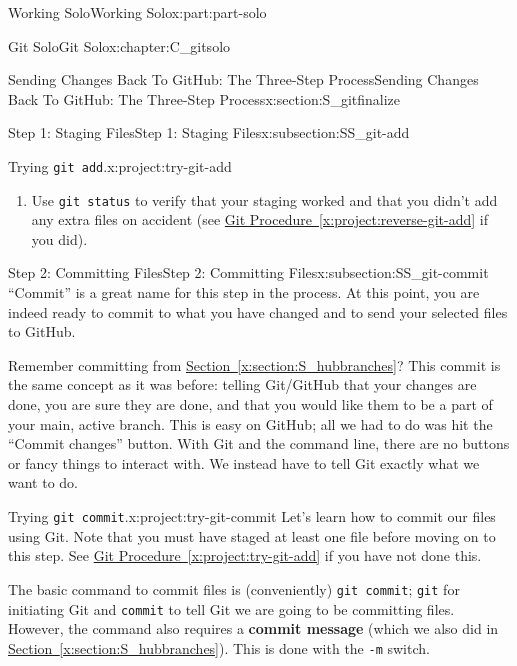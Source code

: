 \documentclass[oneside,10pt,]{book}
\newcommand{\blocktitlefont}{\relax}
\newcommand{\xreffont}{\relax}
\newcommand{\mono}[1]{\texttt{#1}}
\newcommand{\terminology}[1]{\textbf{#1}}
\begin{document}
\begin{partptx}{Working Solo}{}{Working Solo}{}{}{x:part:part-solo}
\begin{chapterptx}{Git Solo}{}{Git Solo}{}{}{x:chapter:C_gitsolo}
\begin{sectionptx}{Sending Changes Back To GitHub: The Three-Step Process}{}{Sending Changes Back To GitHub: The Three-Step Process}{}{}{x:section:S_gitfinalize}
\begin{subsectionptx}{Step 1: Staging Files}{}{Step 1: Staging Files}{}{}{x:subsection:SS_git-add}
\begin{project}{Trying \mono{git add}.}{x:project:try-git-add}
\begin{enumerate}[font=\bfseries,label=(\alph*),ref=\alph*]
\par\smallskip%
\noindent\textbf{\blocktitlefont Hint}.\hypertarget{g:hint:idm479812568}{}\quad{}Case 1 or Case 3 will work in this instance.%
\item{}Use \mono{git status} to verify that your staging worked and that you didn't add any extra files on accident (see \hyperref[x:project:reverse-git-add]{Git Procedure~{\xreffont\ref{x:project:reverse-git-add}}} if you did).%
\end{enumerate}
\end{project}%
\end{subsectionptx}
%
%
\typeout{************************************************}
\typeout{************************************************}
%
\begin{subsectionptx}{Step 2: Committing Files}{}{Step 2: Committing Files}{}{}{x:subsection:SS_git-commit}
%
%
%
%
``Commit'' is a great name for this step in the process. At this point, you are indeed ready to commit to what you have changed and to send your selected files to GitHub.%
\par
Remember committing from \hyperref[x:section:S_hubbranches]{Section~{\xreffont\ref{x:section:S_hubbranches}}}? This commit is the same concept as it was before: telling Git\slash{}GitHub that your changes are done, you are sure they are done, and that you would like them to be a part of your main, active branch. This is easy on GitHub; all we had to do was hit the ``Commit changes'' button. With Git and the command line, there are no buttons or fancy things to interact with. We instead have to tell Git exactly what we want to do.%
\begin{project}{Trying \mono{git commit}.}{x:project:try-git-commit}%
Let's learn how to commit our files using Git. Note that you must have staged at least one file before moving on to this step. See \hyperref[x:project:try-git-add]{Git Procedure~{\xreffont\ref{x:project:try-git-add}}} if you have not done this.%
\par
The basic command to commit files is (conveniently) \mono{git commit}; \mono{git} for initiating Git and \mono{commit} to tell Git we are going to be committing files. However, the command also requires a \terminology{commit message} (which we also did in \hyperref[x:section:S_hubbranches]{Section~{\xreffont\ref{x:section:S_hubbranches}}}). This is done with the \mono{-m} switch.%
\begin{enumerate}[font=\bfseries,label=(\alph*),ref=\alph*]

\end{enumerate}
\end{project}
\end{subsectionptx}
\end{sectionptx}
\end{chapterptx}
\end{partptx}
\end{document}
